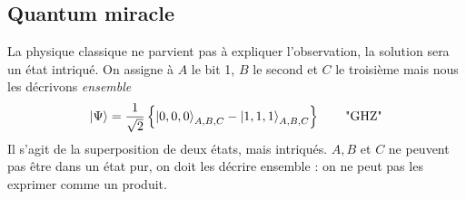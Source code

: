 \subsection{Quantum miracle}
La physique classique ne parvient pas à expliquer l'observation, la solution sera un état intriqué. On
assigne à $A$ le bit 1, $B$ le second et $C$ le troisième mais nous les décrivons \textit{ensemble}
\begin{equation}
\ket\Psi = \frac{1}{\sqrt{2}}\left\{\ket{0,0,0}_{A,B,C}-\ket{1,1,1}_{A,B,C}\right\}\qquad
\text{"GHZ"}
\end{equation}
Il s'agit de la superposition de deux états, mais intriqués. $A,B$ et $C$ ne peuvent pas être
dans un état pur, on doit les décrire ensemble : on ne peut pas les exprimer comme un produit.\\

